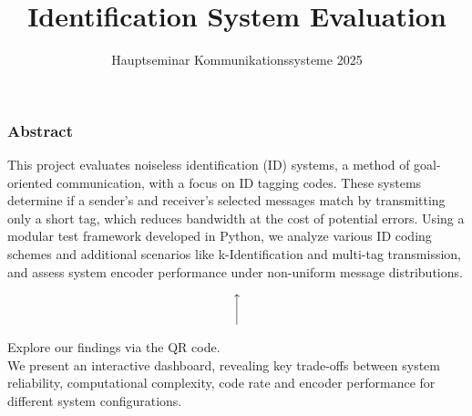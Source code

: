 \documentclass[%
  english,%
  paper=A1,%
  fontsize=22pt,%
  cdfoot=5ex,%
  ddcfoot,%
  BCOR=-20mm,
]{tudscrposter}
\begin{document}

\department[]{}
\chair[]{}
\title{Identification System Evaluation}
\subtitle{Hauptseminar Kommunikationssysteme 2025}
\date{}
\contactperson{}
\professor{}
 

\maketitle
\setlength\parindent{0pt}

\subsubsection*{Abstract}
    
\begin{multicols}{3}
This project evaluates noiseless identification (ID) systems, a method of goal-oriented communication, with a focus on ID tagging codes. These systems determine if a sender's and receiver's selected messages match by transmitting only a short tag,  which reduces bandwidth at the cost of potential errors.
Using a modular test framework developed in Python, we analyze various ID coding schemes and additional scenarios like k-Identification and multi-tag transmission, and assess system encoder performance under non-uniform message distributions.
\\

\begin{minipage}{0.32\textwidth}
    \vspace{-13.3em}
    {\centering
    $$\bigg\uparrow$$
    \par}
     Explore our findings via the QR code.\\
     We present an interactive dashboard, revealing key trade-offs between system reliability, computational complexity, code rate and encoder performance for different system configurations.
\end{minipage}
\end{multicols}
\end{document}
